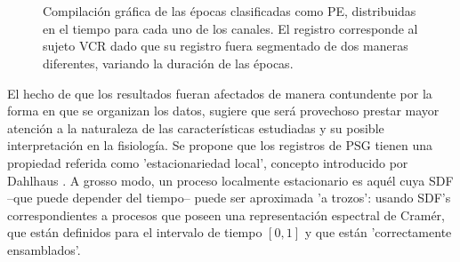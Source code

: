 \documentclass[12pt,a4paper]{mitthesis}
\begin{document}
\begin{figure}
\centering
{}\\
\\
\caption{Compilaci\'on gr\'afica de las \'epocas clasificadas como PE, distribuidas en el tiempo
para cada uno de los canales. El registro corresponde al sujeto VCR dado que su registro fuera
segmentado de dos maneras diferentes, variando la duraci\'on de las \'epocas.}
\label{comp_VCR}
\end{figure}

El hecho de que los resultados fueran afectados de manera contundente por la forma en que se 
organizan los datos, sugiere que ser\'a provechoso prestar mayor atenci\'on a la naturaleza de las 
caracter\'isticas estudiadas y su posible interpretaci\'on en la fisiolog\'ia.
Se propone que los registros de PSG tienen una propiedad referida como 'estacionariedad local',
concepto introducido por Dahlhaus \cite{Dahlhaus97}.
A grosso modo, un proceso localmente estacionario es aqu\'el cuya SDF --que puede depender del 
tiempo-- puede ser aproximada 'a trozos': usando SDF's correspondientes a procesos que poseen una 
representaci\'on espectral de Cram\'er, que est\'an definidos para el intervalo de tiempo $[0,1]$ 
y que est\'an 'correctamente ensamblados'.
\end{document}
